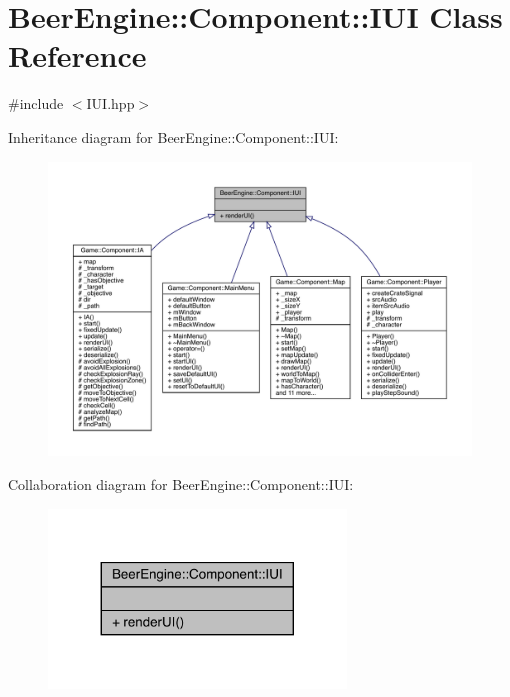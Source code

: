 \hypertarget{class_beer_engine_1_1_component_1_1_i_u_i}{}\section{Beer\+Engine\+:\+:Component\+:\+:I\+UI Class Reference}
\label{class_beer_engine_1_1_component_1_1_i_u_i}


{\ttfamily \#include $<$I\+U\+I.\+hpp$>$}



Inheritance diagram for Beer\+Engine\+:\+:Component\+:\+:I\+UI\+:\nopagebreak
\begin{figure}[H]
\begin{center}
\leavevmode
\includegraphics[width=350pt]{class_beer_engine_1_1_component_1_1_i_u_i__inherit__graph}
\end{center}
\end{figure}


Collaboration diagram for Beer\+Engine\+:\+:Component\+:\+:I\+UI\+:\nopagebreak
\begin{figure}[H]
\begin{center}
\leavevmode
\includegraphics[width=224pt]{class_beer_engine_1_1_component_1_1_i_u_i__coll__graph}
\end{center}
\end{figure}
